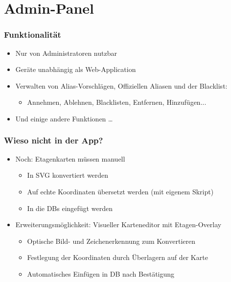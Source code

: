 \section{Admin-Panel}

\begin{frame}\frametitle{Funktionalität}
    \begin{itemize}
        \item Nur von Administratoren nutzbar
        \item Geräte unabhängig als Web-Application
        \item Verwalten von Alias-Vorschlägen, Offiziellen Aliasen und der Blacklist: \begin{itemize}
            \item Annehmen, Ablehnen, Blacklisten, Entfernen, Hinzufügen...
        \end{itemize}
        \item Und einige andere Funktionen \dots
    \end{itemize}
\end{frame}

\begin{frame}\frametitle{Wieso nicht in der App?}
    \begin{itemize}
        \item Noch: Etagenkarten müssen manuell \begin{itemize}
            \item In SVG konvertiert werden
            \item Auf echte Koordinaten übersetzt werden (mit eigenem Skript)
            \item In die DBs eingefügt werden
        \end{itemize}
        \item Erweiterungsmöglichkeit: Visueller Karteneditor mit Etagen-Overlay \begin{itemize}
            \item Optische Bild- und Zeichenerkennung zum Konvertieren
            \item Festlegung der Koordinaten durch Überlagern auf der Karte
            \item Automatisches Einfügen in DB nach Bestätigung   
        \end{itemize}
    \end{itemize}
\end{frame}